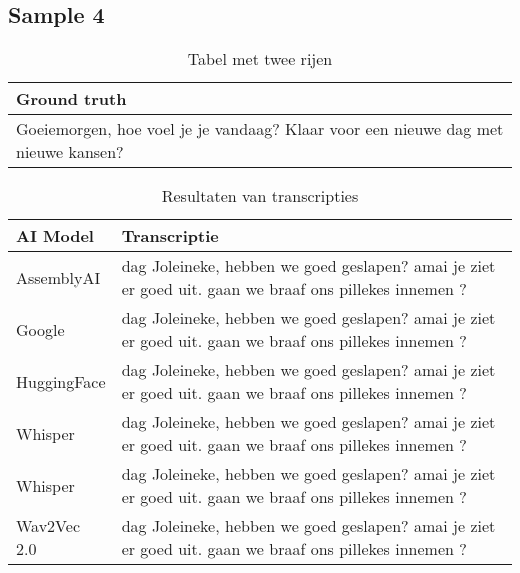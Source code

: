 \subsection{Sample 4}
\begin{table}[htbp]
    \centering
    \label{tab:groundtruth_sample4}
    \begin{tabularx}{\textwidth}{|X|}
        \hline
        \textbf{Ground truth} \\
        
        \hline
        Goeiemorgen, hoe voel je je vandaag? Klaar voor een nieuwe dag met nieuwe kansen? \\
        \hline
    \end{tabularx}
    \caption{Tabel met twee rijen}
\end{table}

\begin{table}[htbp]
    \centering
    \label{tab:results_sample4}
    \begin{tabularx}{\textwidth}{|l|X|}
        \hline
        \textbf{AI Model} & \textbf{Transcriptie} \\ \midrule
        
        AssemblyAI & dag Joleineke, hebben we goed geslapen? amai je ziet er goed uit. gaan we braaf ons pillekes innemen ? \\ \hline
        
        Google & dag Joleineke, hebben we goed geslapen? amai je ziet er goed uit. gaan we braaf ons pillekes innemen ? \\ \hline
        
        HuggingFace & dag Joleineke, hebben we goed geslapen? amai je ziet er goed uit. gaan we braaf ons pillekes innemen ? \\ \hline
        
        Whisper & dag Joleineke, hebben we goed geslapen? amai je ziet er goed uit. gaan we braaf ons pillekes innemen ? \\ \hline
        
        Whisper & dag Joleineke, hebben we goed geslapen? amai je ziet er goed uit. gaan we braaf ons pillekes innemen ? \\ \hline
        
        Wav2Vec 2.0 & dag Joleineke, hebben we goed geslapen? amai je ziet er goed uit. gaan we braaf ons pillekes innemen ? \\ \hline
    \end{tabularx}
    \caption{Resultaten van transcripties}
\end{table}
